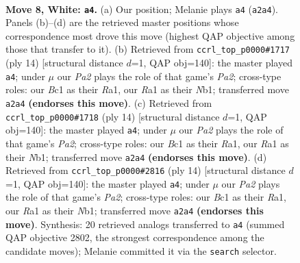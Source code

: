 \documentclass[11pt]{article}
\begin{document}
\begin{figure}[p]\centering
\begin{subfigure}{0.46\textwidth}\centering
\resizebox{\linewidth}{!}{%
\newchessgame
\chessboard[
  setfen={rnbqkb1r/1p3pp1/p3pn2/2p4p/3P4/1B2PN2/PP3PPP/RNBQ1RK1 w kq - 0 8},
  showmover=false,
  pgfstyle=straightmove, color=movearrow, markmove={a2-a4}
]}
\caption{}
\end{subfigure}\hfill
\begin{subfigure}{0.46\textwidth}\centering
\resizebox{\linewidth}{!}{%
\newchessgame
\chessboard[
  setfen={rnbqkb1r/5ppp/p3pn2/1pp5/3P4/1B2PN2/PP3PPP/RNBQ1RK1 w kq - 0 8},
  showmover=false,
  pgfstyle=straightmove, color=movearrow, markmove={a2-a4}
]}
\caption{}
\end{subfigure}
\\[4pt]
\begin{subfigure}{0.46\textwidth}\centering
\resizebox{\linewidth}{!}{%
\newchessgame
\chessboard[
  setfen={rnbqkb1r/5ppp/p3pn2/1pp5/3P4/1B2PN2/PP3PPP/RNBQ1RK1 w kq - 0 8},
  showmover=false,
  pgfstyle=straightmove, color=movearrow, markmove={a2-a4}
]}
\caption{}
\end{subfigure}\hfill
\begin{subfigure}{0.46\textwidth}\centering
\resizebox{\linewidth}{!}{%
\newchessgame
\chessboard[
  setfen={rnbqkb1r/5ppp/p3pn2/1pp5/3P4/1B2PN2/PP3PPP/RNBQ1RK1 w kq - 0 8},
  showmover=false,
  pgfstyle=straightmove, color=movearrow, markmove={a2-a4}
]}
\caption{}
\end{subfigure}
\caption{\textbf{Move 8, White: \texttt{a4}.} (a) Our position; Melanie plays \texttt{a4} (\texttt{a2a4}). Panels (b)--(d) are the retrieved master positions whose correspondence most drove this move (highest QAP objective among those that transfer to it). (b) Retrieved from \texttt{ccrl\_top\_p0000\#1717} (ply 14) [structural distance $d$=1, QAP obj=140]: the master played \texttt{a4}; under $\mu$ our \emph{Pa2} plays the role of that game's \emph{Pa2}; cross-type roles: our \emph{B}c1 as their \emph{R}a1, our \emph{R}a1 as their \emph{N}b1; transferred move \texttt{a2a4} \textbf{(endorses this move)}. (c) Retrieved from \texttt{ccrl\_top\_p0000\#1718} (ply 14) [structural distance $d$=1, QAP obj=140]: the master played \texttt{a4}; under $\mu$ our \emph{Pa2} plays the role of that game's \emph{Pa2}; cross-type roles: our \emph{B}c1 as their \emph{R}a1, our \emph{R}a1 as their \emph{N}b1; transferred move \texttt{a2a4} \textbf{(endorses this move)}. (d) Retrieved from \texttt{ccrl\_top\_p0000\#2816} (ply 14) [structural distance $d$=1, QAP obj=140]: the master played \texttt{a4}; under $\mu$ our \emph{Pa2} plays the role of that game's \emph{Pa2}; cross-type roles: our \emph{B}c1 as their \emph{R}a1, our \emph{R}a1 as their \emph{N}b1; transferred move \texttt{a2a4} \textbf{(endorses this move)}. Synthesis: 20 retrieved analogs transferred to \texttt{a4} (summed QAP objective 2802, the strongest correspondence among the candidate moves); Melanie committed it via the \texttt{search} selector.}
\label{fig:thought-m14}
\end{figure}
\end{document}
